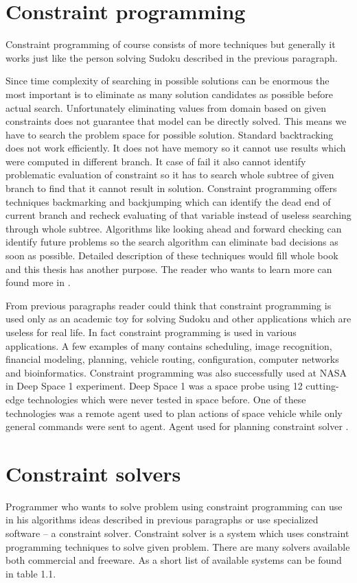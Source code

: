 \section{Constraint programming}
Constraint programming of course consists of more techniques but generally it works 
just like the person solving Sudoku described in the previous paragraph. 

\cite{UI:Bartak}

Since time complexity 
of searching in possible solutions can be enormous the most important is to eliminate as 
many solution candidates as possible before actual search. Unfortunately eliminating values 
from domain based on given constraints does not guarantee that model can be directly solved. 
This means we have to search the problem space for possible solution. Standard backtracking 
does not work efficiently. It does not have memory so it cannot use results which 
were computed in different branch. It case of fail it also cannot identify problematic 
evaluation of constraint so it has to search whole subtree of given branch to find 
that it cannot result in solution. Constraint programming offers techniques backmarking 
and backjumping which can identify the dead end of current branch and recheck evaluating 
of that variable instead of useless searching through whole subtree. Algorithms 
like looking ahead and forward checking can identify future problems so the search 
algorithm can eliminate bad decisions as soon as possible. Detailed description 
of these techniques would fill whole book and this thesis has another purpose. 
The reader who wants to learn more can found more in \cite{bartak:ogcp}.

From previous paragraphs reader could think that constraint programming is used 
only as an academic toy for solving Sudoku and other applications which are useless 
for real life. In fact constraint programming is used in various applications. 
A few examples of many contains scheduling, image recognition, financial modeling, 
planning, vehicle routing, configuration, computer networks and bioinformatics. 
Constraint programming was also successfully used at NASA in Deep Space 1 experiment. 
Deep Space 1 was a space probe using 12 cutting-edge technologies which were never 
tested in space before. One of these technologies was a remote agent used to plan 
actions of space vehicle while only general commands were sent to agent. Agent 
used for planning constraint solver \cite{nasa:ds1-ara}.

\section{Constraint solvers}
Programmer who wants to solve problem using constraint programming can use in his 
algorithms ideas described in previous paragraphs or use specialized software -- a 
constraint solver. Constraint solver is a system which uses constraint programming 
techniques to solve given problem. There are many solvers available both commercial 
and freeware. As a short list of available systems can be found in table 1.1.

